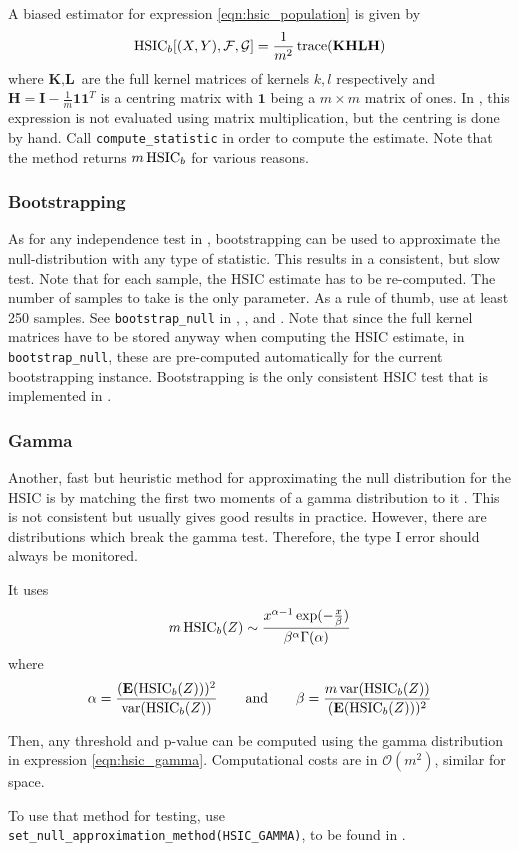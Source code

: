 A biased estimator for expression \ref{eqn:hsic_population} is given by
\begin{align*}
\operatorname{HSIC}_b[(X,Y),\mathcal{F},\mathcal{G}]=\frac{1}{m^2}\operatorname{trace}(\textbf{KHLH})
\end{align*}
where $\textbf{K}, \textbf{L}$ are the full kernel matrices of kernels $k, l$ respectively and $\textbf{H}=\textbf{I}-\frac{1}{m}\textbf{1}\textbf{1}^T$ is a centring matrix with $\textbf{1}$ being a $m\times m$ matrix of ones. In \shogun{}, this expression is not evaluated using matrix multiplication, but the centring is done by hand. Call \texttt{compute\_statistic} in order to compute the estimate. Note that the method returns $m\operatorname{HSIC}_b$ for various reasons.

\subsubsection{Bootstrapping}
As for any independence test in \shogun{}, bootstrapping can be used to approximate the null-distribution with any type of statistic. This results in a consistent, but slow test. Note that for each sample, the HSIC estimate has to be re-computed. The number of samples to take is the only parameter. As a rule of thumb, use at least 250 samples.
See \texttt{bootstrap\_null} in , , and . Note that since the full kernel matrices have to be stored anyway when computing the HSIC estimate, in \texttt{bootstrap\_null}, these are pre-computed automatically for the current bootstrapping instance.
Bootstrapping is the only consistent HSIC test that is implemented in \shogun{}.

\subsubsection{Gamma}
Another, fast but heuristic method for approximating the null distribution for the HSIC is by matching the first two moments of a gamma distribution to it \citep[Equation 9]{Gretton2008d}. This is not consistent but usually gives good results in practice. However, there are distributions which break the gamma test. Therefore, the type I error should always be monitored.

It uses
\begin{align}
\label{eqn:hsic_gamma}
m\operatorname{HSIC}_b(Z) \sim \frac{x^{\alpha-1}\exp(-\frac{x}{\beta})}{\beta^\alpha \Gamma(\alpha)}
\end{align}
where
\begin{align*}
\alpha=\frac{(\textbf{E}(\operatorname{HSIC}_b(Z)))^2}{\operatorname{var}(\operatorname{HSIC}_b(Z))} \qquad \text{and} \qquad
 \beta=\frac{m \operatorname{var}(\operatorname{HSIC}_b(Z))}{(\textbf{E}(\operatorname{HSIC}_b(Z)))^2}
\end{align*}

Then, any threshold and p-value can be computed using the gamma distribution in expression \ref{eqn:hsic_gamma}. Computational costs are in $\mathcal{O}(m^2)$, similar for space.

To use that method for testing, use \texttt{set\_null\_approximation\_method(HSIC\_GAMMA)}, to be found in .